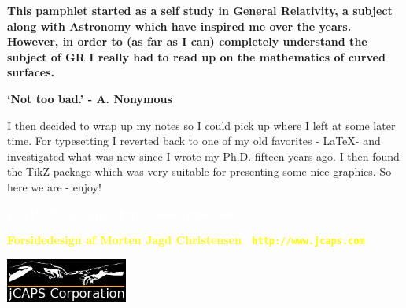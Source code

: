 \documentclass[a4paper,openany,10pt]{memoir}
\theoremstyle{remark} %
\begin{document}
  \clearpage
  \pagecolor[HTML]{FFFFFF}
  \color{black}
  \tableofcontents
  
  
  
%  
  
  
  
  
  
  
  
  \appendix
  
  
  
  
  \printindex

\enlargethispage{3\baselineskip}
\thispagestyle{empty}
\pagecolor[HTML]{660066}

\begin{center}
\begin{minipage}{.9\textwidth}
\color{white}\Large\bfseries
This pamphlet started as a self study in General Relativity, a subject along with 
Astronomy which have inspired me over the years. However, in order to (as far as I can) completely
understand the subject of GR I really had to read up on the mathematics of 
curved surfaces.


\begin{center}
\LARGE\bfseries\sffamily\color{yellow}`Not too bad.' - A. Nonymous
\end{center}

I then decided to wrap up my notes so I could pick up where I left at some later 
time. For typesetting I reverted back to one of my old favorites - \LaTeX - and 
investigated what was new since I wrote my Ph.D. fifteen years ago. I then 
found the TikZ package which was very suitable for presenting some nice graphics.
So here we are - enjoy!

\end{minipage}
\end{center}


\begin{center}
\vspace*{\baselineskip}

\textbf{\textcolor{white}{jCAPS Publishing \textbullet\ \texttt{http://www.jcaps.com}}}

\textbf{\textcolor{yellow}{Forsidedesign af Morten Jagd Christensen \textbullet\ \texttt{http://www.jcaps.com}}}

\vspace{0.25cm}
\includegraphics[width=40mm]{figures/jcapslogo.jpg}
\end{center}

\vspace{1.25cm}

\begin{minipage}{0.5\textwidth}
\colorbox{white}{\EANisbn[SC4]}
\end{minipage}
\end{document}
